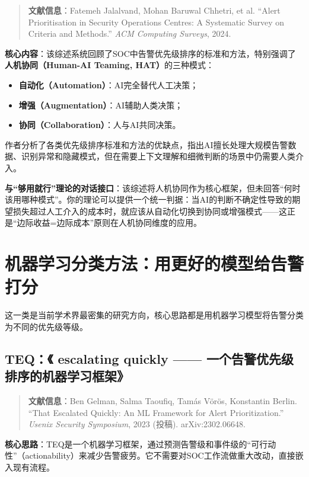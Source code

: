 \documentclass[11pt,a4paper]{article}
\begin{document}
\begin{quote}
\textbf{文献信息}：Fatemeh Jalalvand, Mohan Baruwal Chhetri, et al. “Alert Prioritisation in Security Operations Centres: A Systematic Survey on Criteria and Methods.” \textit{ACM Computing Surveys}, 2024.
\end{quote}

\textbf{核心内容}：该综述系统回顾了SOC中告警优先级排序的标准和方法，特别强调了\textbf{人机协同（Human-AI Teaming, HAT）}的三种模式：

\begin{itemize}
    \item \textbf{自动化（Automation）}：AI完全替代人工决策；
    \item \textbf{增强（Augmentation）}：AI辅助人类决策；
    \item \textbf{协同（Collaboration）}：人与AI共同决策。
\end{itemize}

作者分析了各类优先级排序标准和方法的优缺点，指出AI擅长处理大规模告警数据、识别异常和隐藏模式，但在需要上下文理解和细微判断的场景中仍需要人类介入。

\textbf{与“够用就行”理论的对话接口}：该综述将人机协同作为核心框架，但未回答“何时该用哪种模式”。你的理论可以提供一个统一判据：当AI的判断不确定性导致的期望损失超过人工介入的成本时，就应该从自动化切换到协同或增强模式——这正是“边际收益=边际成本”原则在人机协同维度的应用。

\section{机器学习分类方法：用更好的模型给告警打分}

这一类是当前学术界最密集的研究方向，核心思路都是用机器学习模型将告警分类为不同的优先级等级。

\subsection{TEQ：《 escalating quickly —— 一个告警优先级排序的机器学习框架》}

\begin{quote}
\textbf{文献信息}：Ben Gelman, Salma Taoufiq, Tamás Vörös, Konstantin Berlin. “That Escalated Quickly: An ML Framework for Alert Prioritization.” \textit{Usenix Security Symposium}, 2023 (投稿). arXiv:2302.06648.
\end{quote}

\textbf{核心思路}：TEQ是一个机器学习框架，通过预测告警级和事件级的“可行动性”（actionability）来减少告警疲劳。它不需要对SOC工作流做重大改动，直接嵌入现有流程。
\end{document}
